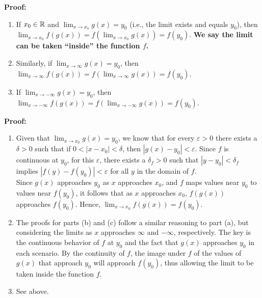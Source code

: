 \bigskip
\textbf{ Proof:}

\begin{enumerate}
    \renewcommand{\labelenumi}{(\alph{enumi})}
    \setlength{\itemsep}{.2cm}
   
    \item If $x_0 \in \mathbb R$ and $\displaystyle \lim_{x \to x_0} g(x) = y_0$ (i.e., the limit exists and equals $y_0$), then $\displaystyle \lim_{x \to x_0} f(g(x)) = f(\lim_{x \to x_0} g(x)) = f(y_0).$ \textbf{We say the limit can be taken ``inside'' the function $f$.}
   
    \item Similarly, if $\displaystyle \lim_{x \to \infty} g(x) = y_0$, then $\displaystyle \lim_{x \to \infty} f(g(x)) = f(\lim_{x \to \infty} g(x)) = f(y_0).$
   
    \item If $\displaystyle \lim_{x \to -\infty} g(x) = y_0$, then $\displaystyle \lim_{x \to -\infty} f(g(x)) = f(\lim_{x \to -\infty} g(x)) = f(y_0).$
\end{enumerate}

\textbf{Proof:}

\begin{enumerate}
\renewcommand{\labelenumi}{(\alph{enumi})}
    \setlength{\itemsep}{.2cm}
   
    \item Given that $\displaystyle \lim_{x \to x_0} g(x) = y_0$, we know that for every $\varepsilon > 0$ there exists a $\delta > 0$ such that if $0 < |x - x_0| < \delta$, then $|g(x) - y_0| < \varepsilon$. Since $f$ is continuous at $y_0$, for this $\varepsilon$, there exists a $\delta_f > 0$ such that $|y - y_0| < \delta_f$ implies $|f(y) - f(y_0)| < \varepsilon$ for all $y$ in the domain of $f$.\\

Since $g(x)$ approaches $y_0$ as $x$ approaches $x_0$, and $f$ maps values near $y_0$ to values near $f(y_0)$, it follows that as $x$ approaches $x_0$, $f(g(x))$ approaches $f(y_0)$. Hence, $\displaystyle \lim_{x \to x_0} f(g(x)) = f(y_0)$.

\item  The proofs for parts (b) and (c) follow a similar reasoning to part (a), but considering the limits as $x$ approaches $\infty$ and $-\infty$, respectively. The key is the continuous behavior of $f$ at $y_0$ and the fact that $g(x)$ approaches $y_0$ in each scenario. By the continuity of $f$, the image under $f$ of the values of $g(x)$ that approach $y_0$ will approach $f(y_0)$, thus allowing the limit to be taken inside the function $f$.

\item See above.


\end{enumerate}


